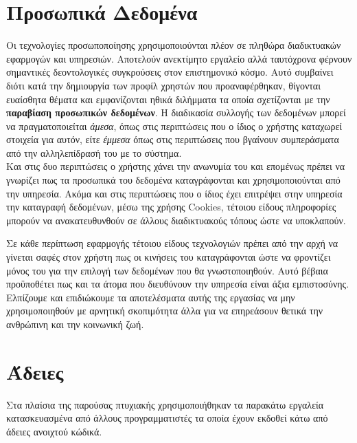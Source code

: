 \section{Προσωπικά Δεδομένα}
\noindent
Οι τεχνολογίες προσωποποίησης χρησιμοποιούνται πλέον σε πληθώρα διαδικτυακών εφαρμογών
και υπηρεσιών. Αποτελούν ανεκτίμητο εργαλείο αλλά ταυτόχρονα φέρνουν
σημαντικές δεοντολογικές συγκρούσεις στον επιστημονικό κόσμο. 
Αυτό συμβαίνει διότι κατά την δημιουργία των προφίλ χρηστών που προαναφέρθηκαν,
θίγονται ευαίσθητα θέματα και εμφανίζονται ηθικά διλήμματα τα οποία σχετίζονται με την 
\textbf{παραβίαση προσωπικών δεδομένων}.
Η διαδικασία συλλογής των δεδομένων μπορεί να πραγματοποιείται \emph{άμεσα}, 
όπως στις περιπτώσεις που ο ίδιος ο χρήστης καταχωρεί στοιχεία για αυτόν, 
είτε \emph{έμμεσα} όπως στις περιπτώσεις που βγαίνουν συμπεράσματα από την 
αλληλεπίδρασή του με το σύστημα.\cite{eirinaki2003web}\\
Και στις δυο περιπτώσεις ο χρήστης χάνει την ανωνυμία του και επομένως πρέπει να γνωρίζει πως τα προσωπικά
του δεδομένα καταγράφονται και χρησιμοποιούνται από την υπηρεσία.
Ακόμα και στις περιπτώσεις που ο ίδιος έχει επιτρέψει στην υπηρεσία την καταγραφή δεδομένων,
μέσω της χρήσης Cookies, τέτοιου είδους πληροφορίες μπορούν να ανακατευθυνθούν σε 
άλλους διαδικτυακούς τόπους ώστε να υποκλαπούν.

Σε κάθε περίπτωση εφαρμογής τέτοιου είδους τεχνολογιών πρέπει από την αρχή να γίνεται
σαφές στον χρήστη πως οι κινήσεις του καταγράφονται ώστε να φροντίζει μόνος του για την 
επιλογή των δεδομένων που θα γνωστοποιηθούν. Αυτό βέβαια προϋποθέτει πως και τα άτομα που 
διευθύνουν την υπηρεσία είναι άξια εμπιστοσύνης. Ελπίζουμε και επιδιώκουμε τα αποτελέσματα
αυτής της εργασίας να μην χρησιμοποιηθούν με αρνητική σκοπιμότητα άλλα για να 
επηρεάσουν θετικά την ανθρώπινη και την κοινωνική ζωή.

\section{Άδειες}
\noindent Στα πλαίσια της παρούσας πτυχιακής χρησιμοποιήθηκαν τα παρακάτω εργαλεία κατασκευασμένα από 
άλλους προγραμματιστές τα οποία έχουν εκδοθεί κάτω από άδειες ανοιχτού κώδικά.\\



